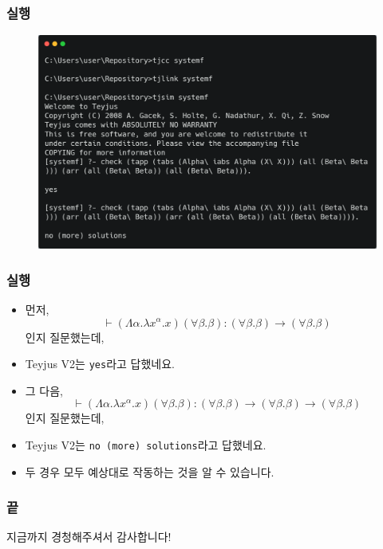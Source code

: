 \documentclass[slidestop,compress,mathserif]{beamer}
\begin{document}
    \begin{frame}
        \frametitle{실행}
        \begin{figure}[h]
            \begin{center}
                \includegraphics[width=1.0\linewidth]{fin.png}
            \end{center}
        \end{figure}
    \end{frame}

    \begin{frame}
        \frametitle{실행}
        \begin{itemize}
            \item 먼저, $$\vdash \left( \Lambda \alpha . \lambda x^{\alpha} . x \right) \left( \forall \beta . \beta \right) : \left( \forall \beta . \beta \right) \to \left( \forall \beta . \beta \right)$$인지 질문했는데,
            \item Teyjus V2는 \texttt{yes}라고 답했네요.
            \item 그 다음, $$\vdash \left( \Lambda \alpha . \lambda x^{\alpha} . x \right) \left( \forall \beta . \beta \right) : \left( \forall \beta . \beta \right) \to \left( \forall \beta . \beta \right) \to \left( \forall \beta . \beta \right)$$인지 질문했는데,
            \item Teyjus V2는 \texttt{no (more) solutions}라고 답했네요.
            \item 두 경우 모두 예상대로 작동하는 것을 알 수 있습니다.
        \end{itemize}
    \end{frame}
    
    \begin{frame}[c]
        \frametitle{끝}
        \centering
        지금까지 경청해주셔서 감사합니다!
    \end{frame}
\end{document}
